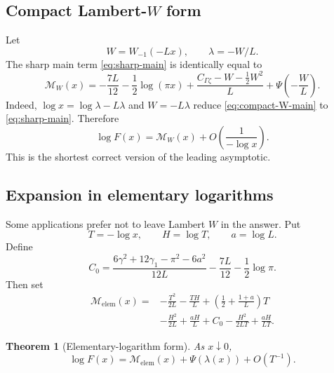 \documentclass[11pt,oneside]{article}
\newtheorem{theorem}{Theorem}[section]
\theoremstyle{definition}
\theoremstyle{remark}
\newcommand{\Lam}{\lambda}
\newcommand{\Ltwo}{L}
\newcommand{\PsiPer}{\Psi}
\begin{document}
\subsection{Compact Lambert-\texorpdfstring{$W$}{W} form}

Let
\begin{equation}\label{eq:W-short}
  W=W_{-1}(-\Ltwo x),\qquad \Lam=-W/\Ltwo.
\end{equation}
The sharp main term \eqref{eq:sharp-main} is identically equal to
\begin{equation}\label{eq:compact-W-main}
 \mathcal M_W(x)=
 -\frac{7\Ltwo}{12}-\frac12\log(\pi x)
 +\frac{C_{\Gamma\zeta}-W-\tfrac12W^2}{\Ltwo}
 +\PsiPer\left(-\frac W{\Ltwo}\right).
\end{equation}
Indeed, $\log x=\log\Lam-\Ltwo\Lam$ and $W=-\Ltwo\Lam$ reduce
\eqref{eq:compact-W-main} to \eqref{eq:sharp-main}.  Therefore
\begin{equation}\label{eq:compact-W-asymptotic}
  \log F(x)=\mathcal M_W(x)+O\left(\frac1{-\log x}\right).
\end{equation}
This is the shortest correct version of the leading asymptotic.

\subsection{Expansion in elementary logarithms}

Some applications prefer not to leave Lambert $W$ in the answer.  Put
\begin{equation}\label{eq:T-H-a}
  T=-\log x,\qquad H=\log T,\qquad a=\log\Ltwo.
\end{equation}
Define
\begin{equation}\label{eq:C0-elementary}
 C_0=
 \frac{6\gamma^2+12\gamma_1-\pi^2-6a^2}{12\Ltwo}
 -\frac{7\Ltwo}{12}-\frac12\log\pi.
\end{equation}
Then set
\begin{equation}\label{eq:elementary-main}
\begin{split}
 \mathcal M_{\mathrm{elem}}(x)={}&
 -\frac{T^2}{2\Ltwo}-\frac{TH}{\Ltwo}
 +\left(\frac12+\frac{1+a}{\Ltwo}\right)T\\
 &-\frac{H^2}{2\Ltwo}+\frac{aH}{\Ltwo}+C_0
 -\frac{H^2}{2\Ltwo T}+\frac{aH}{\Ltwo T}.
\end{split}
\end{equation}

\begin{theorem}[Elementary-logarithm form]\label{thm:elementary-asymptotic}
As $x\downarrow0$,
\begin{equation}\label{eq:elementary-asymptotic}
  \log F(x)=\mathcal M_{\mathrm{elem}}(x)
  +\PsiPer(\Lam(x))+O(T^{-1}).
\end{equation}
\end{theorem}
\end{document}
